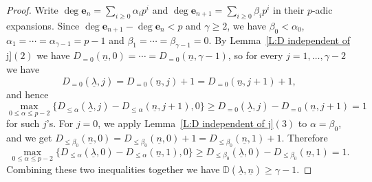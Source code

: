 \documentclass[12pt]{amsart}
\theoremstyle{definition}
\numberwithin{equation}{subsection}
\def\DD{\mathbb{D}}
\def\bfe{\mathbf{e}}
\begin{document}
\begin{proof}
		 Write $\deg \bfe_n=\sum\limits_{i\geq 0} \alpha_ip^i$ and $\deg \bfe_{n+1}=\sum\limits_{i\geq 0}\beta_ip^i$ in their $p$-adic expansions. Since $\deg\bfe_{n+1}-\deg \bfe_n<p$ and $\gamma\geq 2$,  we have $\beta_0<\alpha_0$, $\alpha_1=\cdots =\alpha_{\gamma-1}=p-1$ and $\beta_1=\cdots =\beta_{\gamma-1}=0$. 
By Lemma~\ref{L:D independent of j}$(2)$ we have $D_{=0}(\underline n, 0) = \cdots = D_{=0}(\underline n, \gamma-1)$, so for every $j = 1, \dots, \gamma-2$ we have 
		$$
		D_{= 0}(\underline \lambda,j) = D_{=0}(\underline n, j) + 1=D_{=0}(\underline n, j+1) + 1,
		$$
		and hence 
		\[
		\max_{0\leq \alpha\leq p-2}\{D_{\leq \alpha}(\underline \lambda,j)-D_{\leq \alpha}(\underline n,j+1),0 \}\geq D_{=0}(\underline \lambda,j)-D_{=0}(\underline n,j+1)=1
		\]
		for such $j$'s. For $j=0$, we apply Lemma~\ref{L:D independent of j}$(3)$ to $\alpha=\beta_0$, and we get
		$D_{\leq \beta_0}(\underline n,0)=D_{\leq \beta_0}(\underline n,0)+1=D_{\leq \beta_0}(\underline n,1)+1$. Therefore 
		\[
		\max_{0\leq \alpha\leq p-2}\{D_{\leq \alpha}(\underline \lambda,0)-D_{\leq \alpha}(\underline n,1),0 \}\geq D_{\leq \beta_0}(\underline \lambda,0)-D_{\leq \beta_0}(\underline n,1)=  1.
		\]
		Combining these two inequalities together we have $\DD(\underline \lambda, \underline n) \geq \gamma-1$.
\end{proof}
\end{document}
